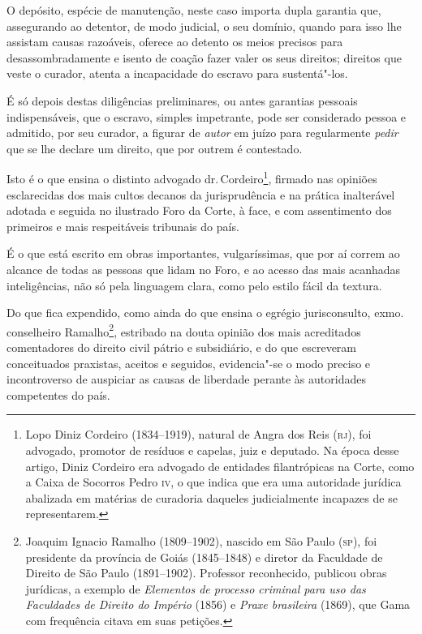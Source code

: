 O depósito, espécie de manutenção, neste caso importa dupla garantia
que, assegurando ao detentor, de modo judicial, o seu domínio, quando
para isso lhe assistam causas razoáveis, oferece ao detento os meios
precisos para desassombradamente e isento de coação fazer valer os seus
direitos; direitos que veste o curador, atenta a incapacidade do escravo
para sustentá"-los.

É só depois destas diligências preliminares, ou antes garantias pessoais
indispensáveis, que o escravo, simples impetrante, pode ser considerado
pessoa e admitido, por seu curador, a figurar de \emph{autor} em juízo
para regularmente \emph{pedir} que se lhe declare um direito, que por
outrem é contestado.

Isto é o que ensina o distinto advogado dr.\,Cordeiro\footnote{Lopo
  Diniz Cordeiro (1834--1919), natural de Angra dos Reis (\textsc{rj}), foi
  advogado, promotor de resíduos e capelas, juiz e deputado. Na época
  desse artigo, Diniz Cordeiro era advogado de entidades filantrópicas
  na Corte, como a Caixa de Socorros Pedro \textsc{iv}, o que indica que era uma
  autoridade jurídica abalizada em matérias de curadoria daqueles
  judicialmente incapazes de se representarem.}, firmado nas opiniões
esclarecidas dos mais cultos decanos da jurisprudência e na prática
inalterável adotada e seguida no ilustrado Foro da Corte, à face, e com
assentimento dos primeiros e mais respeitáveis tribunais do país.

É o que está escrito em obras importantes, vulgaríssimas, que por aí
correm ao alcance de todas as pessoas que lidam no Foro, e ao acesso das
mais acanhadas inteligências, não só pela linguagem clara, como pelo
estilo fácil da textura.

Do que fica expendido, como ainda do que ensina o egrégio jurisconsulto,
exmo.\,conselheiro Ramalho\footnote{Joaquim Ignacio Ramalho
  (1809--1902), nascido em São Paulo (\textsc{sp}), foi presidente da província de
  Goiás (1845--1848) e diretor da Faculdade de Direito de São Paulo
  (1891--1902). Professor reconhecido, publicou obras jurídicas, a
  exemplo de \emph{Elementos de processo criminal para uso das
  Faculdades de Direito do Império} (1856) e \emph{Praxe brasileira}
  (1869), que Gama com frequência citava em suas petições.}, estribado
na douta opinião dos mais acreditados comentadores do direito civil
pátrio e subsidiário, e do que escreveram conceituados praxistas,
aceitos e seguidos, evidencia"-se o modo preciso e incontroverso de
auspiciar as causas de liberdade perante às autoridades competentes do
país.

